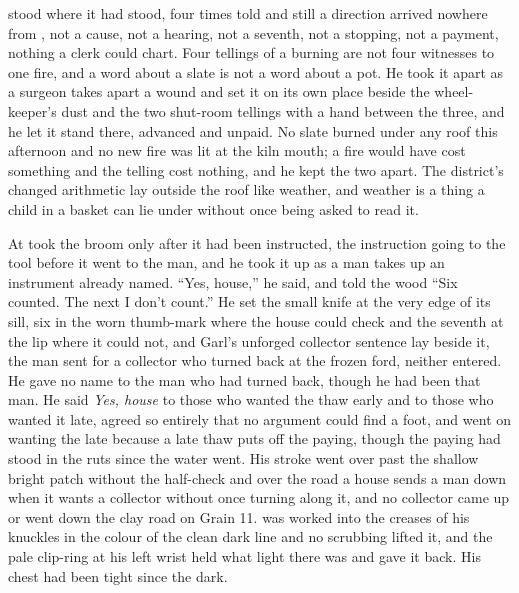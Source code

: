  stood where it had stood, four times told and still a direction arrived nowhere from , not a cause, not a hearing, not a seventh, not a stopping, not a payment, nothing a clerk could chart. Four tellings of a burning are not four witnesses to one fire, and a word about a slate is not a word about a pot. He took it apart as a surgeon takes apart a wound and set it on its own place beside the wheel-keeper's dust and the two shut-room tellings with a hand between the three, and he let it stand there, advanced and unpaid. No slate burned under any roof this afternoon and no new fire was lit at the kiln mouth; a fire would have cost something and the telling cost nothing, and he kept the two apart. The district's changed arithmetic lay outside the roof like weather, and weather is a thing a child in a basket can lie under without once being asked to read it.

\scenebreak

At   took the broom only after it had been instructed, the instruction going to the tool before it went to the man, and he took it up as a man takes up an instrument already named. “Yes, house,” he said, and told the wood “Six counted. The next I don't count.” He set the small knife at the very edge of its sill, six in the worn thumb-mark where the house could check and the seventh at the lip where it could not, and Garl's unforged collector sentence lay beside it, the man sent for a collector who turned back at the frozen ford, neither entered. He gave no name to the man who had turned back, though he had been that man. He said \emph{Yes, house} to those who wanted the thaw early and to those who wanted it late, agreed so entirely that no argument could find a foot, and went on wanting the late because a late thaw puts off the paying, though the paying had stood in the ruts since the water went. His stroke went over  past the shallow bright patch without the half-check and over the road a house sends a man down when it wants a collector without once turning along it, and no collector came up or went down the clay road on Grain 11.  was worked into the creases of his knuckles in the colour of the clean dark line and no scrubbing lifted it, and the pale clip-ring at his left wrist held what light there was and gave it back. His chest had been tight since the dark.

